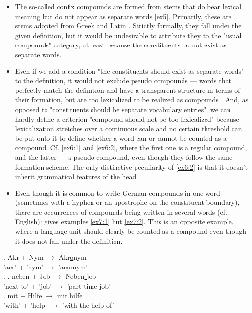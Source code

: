 \documentclass[11pt]{article}
\begin{document}
\begin{itemize}

    \item The so-called confix compounds are formed from stems that do bear lexical meaning but do not appear as separate words \ref{ex5}. Primarily, these are stems adopted from Greek and Latin \cite[231-233]{eisenberg2016grundriss}. Strictly formally, they fall under the given definition, but it would be undesirable to attribute they to the "usual compounds" category, at least because the constituents do not exist as separate words.

    \item Even if we add a condition "the constituents should exist as separate words" to the definition, it would not exclude pseudo compounds --- words that perfectly match the definition and have a transparent structure in terms of their formation, but are too lexicalized to be realized as compounds \cite[223-225]{eisenberg2016grundriss}. And, as opposed to "constituents should be separate vocabulary entries", we can hardly define a criterion "compound should not be too lexicalized" because lexicalization stretches over a continuous scale and no certain threshold can be put onto it to define whether a word can or cannot be counted as a compound. Cf. \ref{ex6:1} and \ref{ex6:2}, where the first one is a regular compound, and the latter --- a pseudo compound, even though they follow the same formation scheme. The only distinctive peculiarity of \ref{ex6:2} is that it doesn't inherit grammatical features of the head.

    \item Even though it is common to write German compounds in one word (sometimes with a hyphen or an apostrophe on the constituent boundary), there are occurrences of compounds being written in several words (cf. English): \citet{Scherer+2012+57+82} gives examples \ref{ex7:1} but \ref{ex7:2}. This is an opposite example, where a language unit should clearly be counted as a compound even though it does not fall under the definition.
    
\end{itemize}

\exg. \label{ex5}Akr + Nym {$\rightarrow$} Akr\underline{o}nym \\
'acr' + 'nym' {$\rightarrow$} 'acronym' \\

\ex.
\ag. \label{ex6:1}neben + Job {$\rightarrow$} Neben\underline{ }job \\
{'next to'} + 'job' {$\rightarrow$} {'part-time job'} \\
\bg. \label{ex6:2}mit + Hilfe {$\rightarrow$} mit\underline{ }hilfe \\
'with' + 'help' {$\rightarrow$} {'with the help of'} \\
\end{document}
